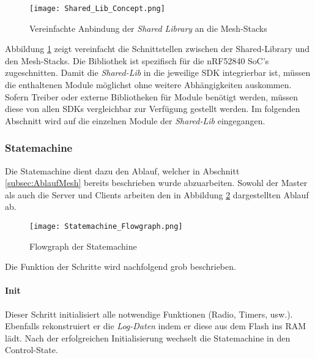 \begin{figure}[H]
	\centering
	\texttt{[image: Shared\_Lib\_Concept.png]}
	\caption{Vereinfachte Anbindung der \textit{Shared Library} an die Mesh-Stacks}\label{fig:ShardeLibConcept}
\end{figure}


Abbildung \ref{fig:ShardeLibConcept} zeigt vereinfacht die Schnittstellen zwischen der Shared-Library und den Mesh-Stacks.
Die Bibliothek ist spezifisch für die nRF52840 SoC's zugeschnitten.
Damit die \textit{Shared-Lib} in die jeweilige SDK integrierbar ist, müssen die enthaltenen Module möglichst ohne weitere Abhängigkeiten auskommen.
Sofern Treiber oder externe Bibliotheken für Module benötigt werden, müssen diese von allen SDKs vergleichbar zur Verfügung gestellt werden.
Im folgenden Abschnitt wird auf die einzelnen Module der \textit{Shared-Lib} eingegangen. 


\subsubsection{Statemachine}\label{subsubsec:StatemachineSoftware}

Die Statemachine dient dazu den Ablauf, welcher in Abschnitt \ref{subsec:AblaufMesh} bereits beschrieben wurde abzuarbeiten. Sowohl der Master als auch die Server und Clients arbeiten den in Abbildung \ref{fig:StatemachineFLowgraph} dargestellten Ablauf ab. 

\begin{figure}[H]
	\centering
	\texttt{[image: Statemachine\_Flowgraph.png]}
	\caption{Flowgraph der Statemachine}\label{fig:StatemachineFLowgraph}
\end{figure}


Die Funktion der Schritte wird nachfolgend grob beschrieben.
\paragraph{Init}
	Dieser Schritt initialisiert alle notwendige Funktionen (Radio, Timers, usw.). Ebenfalls rekonstruiert er die \textit{Log-Daten} indem er diese aus dem Flash ins RAM lädt. Nach der erfolgreichen Initialisierung wechselt die Statemachine in den Control-State.
	
